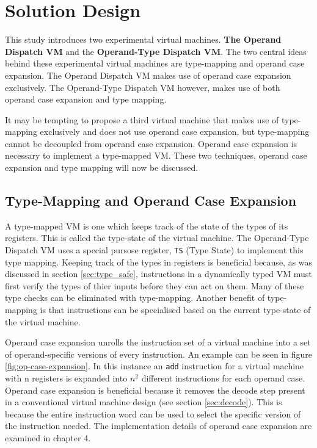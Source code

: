 \documentclass[english,a4paper,12pt]{report}
\begin{document}
\chapter{Solution Design}
This study introduces two experimental virtual machines. \textbf{The
  Operand Dispatch VM} and the \textbf{Operand-Type Dispatch VM}. The
two central ideas behind these experimental virtual machines are
type-mapping and operand case expansion. The Operand Dispatch VM makes
use of operand case expansion exclusively. The Operand-Type Dispatch
VM however, makes use of both operand case expansion and type
mapping. 

It may be tempting to propose a third virtual machine that makes use
of type-mapping exclusively and does not use operand case expansion,
but type-mapping cannot be decoupled from operand case
expansion. Operand case expansion is necessary to implement a
type-mapped VM. These two techniques, operand case expansion and type
mapping will now be discussed.


\section{Type-Mapping and Operand Case Expansion}
\label{sec:type-mapping-op-case-exp}
A type-mapped VM is one which keeps track of the state of the types of
its registers. This is called the type-state of the virtual machine.
The Operand-Type Dispatch VM uses a special pursose register,
\verb|TS| (Type State) to implement this type mapping. Keeping track
of the types in registers is beneficial because, as was discussed in
section \ref{sec:type_safe}, instructions in a dynamically typed VM
must first verify the types of thier inputs before they can act on
them. Many of these type checks can be eliminated with
type-mapping. Another benefit of type-mapping is that instructions can
be specialised based on the current type-state of the virtual machine.

Operand case expansion unrolls the instruction set of a virtual
machine into a set of operand-specific versions of every
instruction. An example can be seen in figure
\ref{fig:op-case-expansion}. In this instance an \verb|add|
instruction for a virtual machine with n registers is expanded into
$n^2$ different instructions for each operand case. Operand case
expansion is beneficial because it removes the decode step present in
a conventional virtual machine design (see section
\ref{sec:decode}). This is because the entire instruction word can be
used to select the specific version of the instruction needed. The
implementation details of operand case expansion are examined in chapter 4. 
\end{document}
